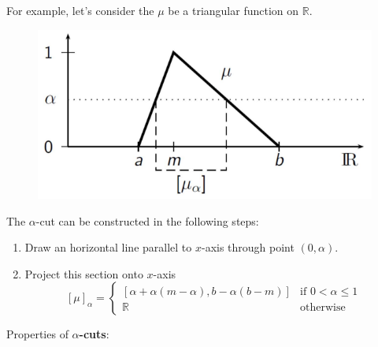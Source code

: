 \documentclass{article}
\begin{document}
For example, let's consider the $\mu$ be a triangular function on $\mathbb{R}$.
\begin{figure}[H]
    \centering
    \includegraphics[scale=0.5]{images/triangular-horiz-repr.png}
\end{figure}
The $\alpha$-cut can be constructed in the following steps:
\begin{enumerate}
    \item Draw an horizontal line parallel to $x$-axis through point $(0,\alpha)$.
    \item Project this section onto $x$-axis
          \[
              [\mu]_\alpha =
              \begin{cases}
                  [\alpha + \alpha (m-\alpha),b-\alpha(b-m)] & \text{if } 0<\alpha\leq 1 \\
                  \mathbb{R}                                 & \text{otherwise}
              \end{cases}
          \]
\end{enumerate}
Properties of \textbf{$\alpha$-cuts}:
\end{document}
